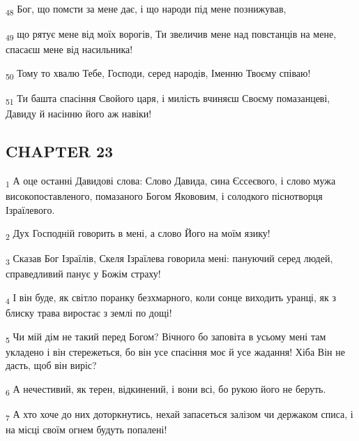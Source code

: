 \begin{tcolorbox}
\textsubscript{48} Бог, що помсти за мене дає, і що народи під мене познижував,
\end{tcolorbox}
\begin{tcolorbox}
\textsubscript{49} що рятує мене від моїх ворогів, Ти звеличив мене над повстанців на мене, спасаєш мене від насильника!
\end{tcolorbox}
\begin{tcolorbox}
\textsubscript{50} Тому то хвалю Тебе, Господи, серед народів, Іменню Твоєму співаю!
\end{tcolorbox}
\begin{tcolorbox}
\textsubscript{51} Ти башта спасіння Свойого царя, і милість вчиняєш Своєму помазанцеві, Давиду й насінню його аж навіки!
\end{tcolorbox}
\subsection{CHAPTER 23}
\begin{tcolorbox}
\textsubscript{1} А оце останні Давидові слова: Слово Давида, сина Єссеєвого, і слово мужа високопоставленого, помазаного Богом Якововим, і солодкого піснотворця Ізраїлевого.
\end{tcolorbox}
\begin{tcolorbox}
\textsubscript{2} Дух Господній говорить в мені, а слово Його на моїм язику!
\end{tcolorbox}
\begin{tcolorbox}
\textsubscript{3} Сказав Бог Ізраїлів, Скеля Ізраїлева говорила мені: пануючий серед людей, справедливий панує у Божім страху!
\end{tcolorbox}
\begin{tcolorbox}
\textsubscript{4} І він буде, як світло поранку безхмарного, коли сонце виходить уранці, як з блиску трава виростає з землі по дощі!
\end{tcolorbox}
\begin{tcolorbox}
\textsubscript{5} Чи мій дім не такий перед Богом? Вічного бо заповіта в усьому мені там укладено і він стережеться, бо він усе спасіння моє й усе жадання! Хіба Він не дасть, щоб він виріс?
\end{tcolorbox}
\begin{tcolorbox}
\textsubscript{6} А нечестивий, як терен, відкинений, і вони всі, бо рукою його не беруть.
\end{tcolorbox}
\begin{tcolorbox}
\textsubscript{7} А хто хоче до них доторкнутись, нехай запасеться залізом чи держаком списа, і на місці своїм огнем будуть попалені!
\end{tcolorbox}
